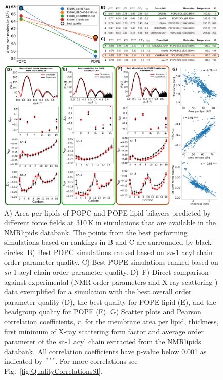 \documentclass[fleqn,10pt]{wlscirep}
\begin{document}
\begin{figure}[!t]
    \centering
    \includegraphics[width=\linewidth]{Figures/quality5.pdf}
    \caption{ A) Area per lipids of POPC and POPE lipid bilayers predicted by different force fields at 310\,K in simulations that are available in the NMRlipids databank. The points from the best performing simulations based on rankings in B and C are surrounded by black circles. 
    B) Best POPC simulations ranked based on {\it sn}-1 acyl chain order parameter quality.
    C) Best POPE simulations ranked based on {\it sn}-1 acyl chain order parameter quality. 
    D)--F) Direct comparison against experimental (NMR order parameters and X-ray scattering ) data exemplified for a simulation with the best overall order parameter quality (D), the best quality for POPE lipid (E), and the headgroup quality for POPE (F).
    G) Scatter plots and Pearson correlation coefficients, $r$, for the membrane area per lipid, thickness, first minimum of X-ray scattering form factor and average order parameter of the {\textit sn}-1 acyl chain extracted from the NMRlipids databank. All correlation coefficients have p-value below 0.001 as indicated by~$^{***}$. For more correlations see Fig.~\ref{fig:QualityCorrelationsSI}.
    }
    \label{fig:quality}
\end{figure}


\end{document}

